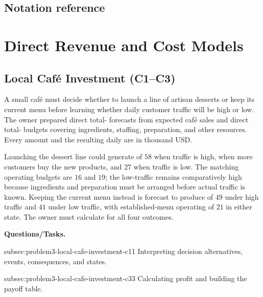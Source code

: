 	
\label{tone:reference}
\subsection*{Notation reference}
\section{Direct Revenue and Cost Models}
	\label{sec:direct-revenue-cost-models}


	\subsection{Local Café Investment (C1--C3)}
	\label{sec:problem3-local-cafe-investment-c1-c3}

	A small café must decide whether to launch a line of artisan desserts or keep its current menu before learning whether daily customer traffic will be high or low. The owner prepared direct total- forecasts from expected café sales and direct total- budgets covering ingredients, staffing, preparation, and other resources. Every amount and the resulting daily  are in thousand USD.

	Launching the dessert line could generate  of \(58\) when traffic is high, when more customers buy the new products, and \(27\) when traffic is low. The matching operating budgets are \(16\) and \(19\); the low-traffic  remains comparatively high because ingredients and preparation must be arranged before actual traffic is known. Keeping the current menu instead is forecast to produce  of \(49\) under high traffic and \(41\) under low traffic, with established-menu operating  of \(21\) in either state. The owner must calculate  for all four outcomes.

	\textbf{Questions/Tasks.}
	\begin{enumerate}
		\CriterionTask
		{subsec:problem3-local-cafe-investment-c1}{1}
		{Interpreting decision alternatives, events, consequences, and states.}

		\CriterionTask
		{subsec:problem3-local-cafe-investment-c3}{3}
		{Calculating profit and building the payoff table.}
	\end{enumerate}

